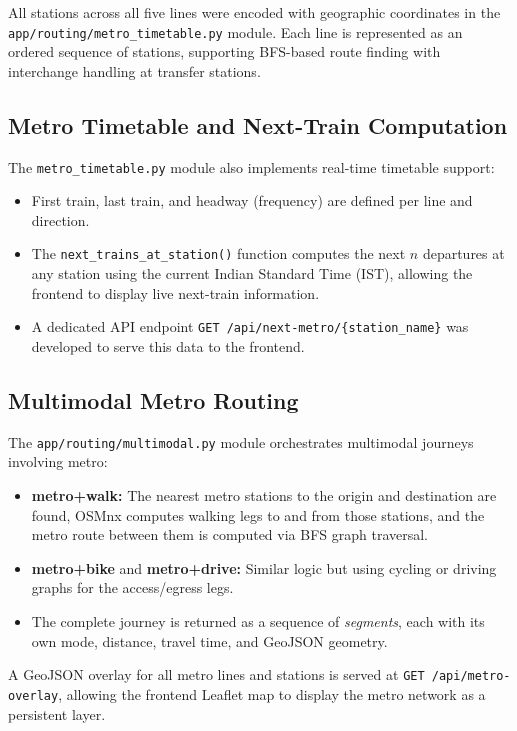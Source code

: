 \documentclass[12pt, a4paper]{report}
\begin{document}
All stations across all five lines were encoded with geographic coordinates in the \texttt{app/routing/metro\_timetable.py} module. Each line is represented as an ordered sequence of stations, supporting BFS-based route finding with interchange handling at transfer stations.

\subsection{Metro Timetable and Next-Train Computation}

The \texttt{metro\_timetable.py} module also implements real-time timetable support:

\begin{itemize}
    \item First train, last train, and headway (frequency) are defined per line and direction.
    \item The \texttt{next\_trains\_at\_station()} function computes the next $n$ departures at any station using the current Indian Standard Time (IST), allowing the frontend to display live next-train information.
    \item A dedicated API endpoint \texttt{GET /api/next-metro/\{station\_name\}} was developed to serve this data to the frontend.
\end{itemize}

\subsection{Multimodal Metro Routing}

The \texttt{app/routing/multimodal.py} module orchestrates multimodal journeys involving metro:

\begin{itemize}
    \item \textbf{metro+walk:} The nearest metro stations to the origin and destination are found, OSMnx computes walking legs to and from those stations, and the metro route between them is computed via BFS graph traversal.
    \item \textbf{metro+bike} and \textbf{metro+drive:} Similar logic but using cycling or driving graphs for the access/egress legs.
    \item The complete journey is returned as a sequence of \textit{segments}, each with its own mode, distance, travel time, and GeoJSON geometry.
\end{itemize}

A GeoJSON overlay for all metro lines and stations is served at \texttt{GET /api/metro-overlay}, allowing the frontend Leaflet map to display the metro network as a persistent layer.
\end{document}
